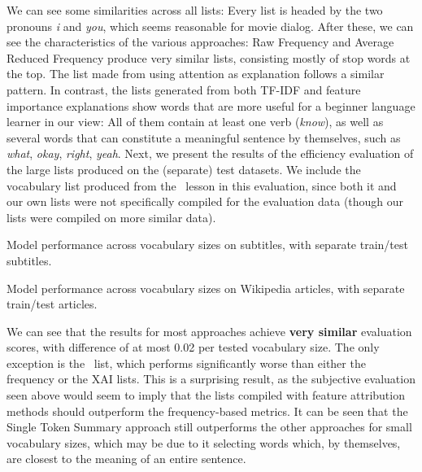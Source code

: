 We can see some similarities across all lists:
Every list is headed by the two pronouns \textit{i} and \textit{you}, which seems reasonable for movie dialog.
After these, we can see the characteristics of the various approaches:
Raw Frequency and Average Reduced Frequency produce very similar lists, consisting mostly of stop words at the top.
The list made from using attention as explanation follows a similar pattern.
In contrast, the lists generated from both TF-IDF and feature importance explanations show words that are more useful for a beginner language learner in our view:
All of them contain at least one verb (\textit{know}), as well as several words that can constitute a meaningful sentence by themselves, such as \textit{what}, \textit{okay}, \textit{right}, \textit{yeah}.
Next, we present the results of the efficiency evaluation of the large lists produced on the (separate) test datasets.
We include the vocabulary list produced from the \Rosetta\ lesson in this evaluation, since both it and our own lists were not specifically compiled for the evaluation data (though our lists were compiled on more similar data).


\begin{table}[H]
	\centering
	\resizebox{\textwidth}{!}{%
		
	}
	\caption{Model performance across vocabulary sizes on subtitles, with separate train/test subtitles.}
	\label{tbl:performance-results-opensubs-large}
\end{table}


\begin{table}[H]
	\centering
	\resizebox{\textwidth}{!}{%
		
	}
	\caption{Model performance across vocabulary sizes on Wikipedia articles, with separate train/test articles.}
	\label{tbl:performance-results-wikipedia-large}
\end{table}

We can see that the results for most approaches achieve \textbf{very similar} evaluation scores, with difference of at most 0.02 per tested vocabulary size.
The only exception is the \Rosetta\ list, which performs significantly worse than either the frequency or the XAI lists.
This is a surprising result, as the subjective evaluation seen above would seem to imply that the lists compiled with feature attribution methods should outperform the frequency-based metrics.
It can be seen that the Single Token Summary approach still outperforms the other approaches for small vocabulary sizes, which may be due to it selecting words which, by themselves, are closest to the meaning of an entire sentence.

